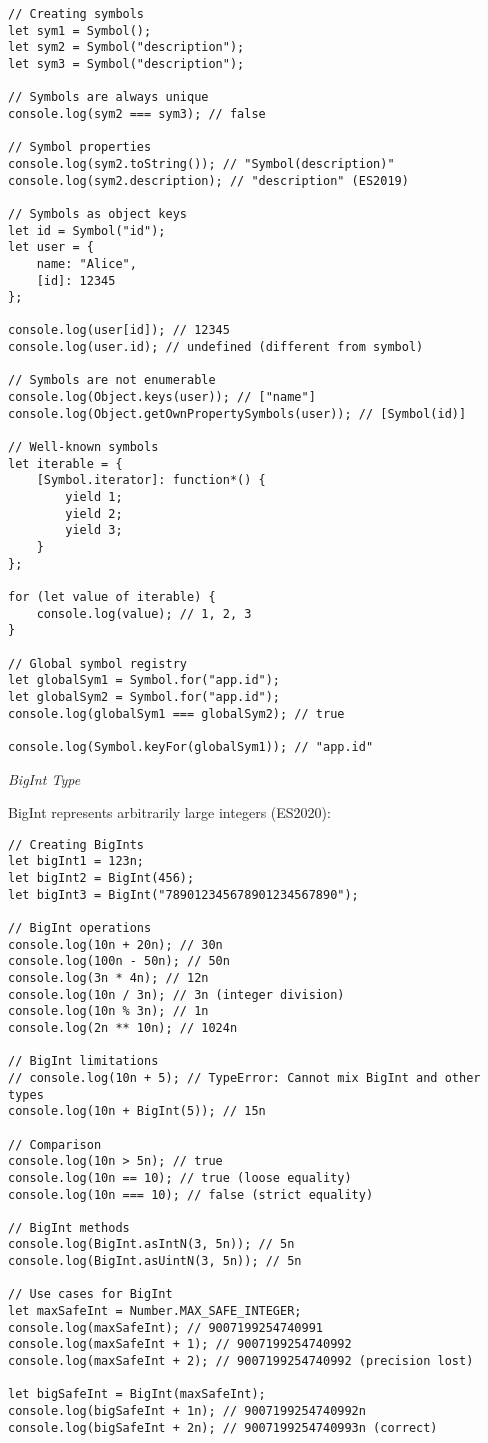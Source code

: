 \documentclass[12pt,a4paper,oneside]{book}
\newcommand{\mysubsubsection}[1]{%
    \vspace{0.1em}
    {\normalsize\itshape #1}
    \vspace{0.1em}
}
\begin{document}
\begin{lstlisting}[style=javascript, caption={\textbf{Symbol Type}}, label=lst:symbol-type]
// Creating symbols
let sym1 = Symbol();
let sym2 = Symbol("description");
let sym3 = Symbol("description");

// Symbols are always unique
console.log(sym2 === sym3); // false

// Symbol properties
console.log(sym2.toString()); // "Symbol(description)"
console.log(sym2.description); // "description" (ES2019)

// Symbols as object keys
let id = Symbol("id");
let user = {
    name: "Alice",
    [id]: 12345
};

console.log(user[id]); // 12345
console.log(user.id); // undefined (different from symbol)

// Symbols are not enumerable
console.log(Object.keys(user)); // ["name"]
console.log(Object.getOwnPropertySymbols(user)); // [Symbol(id)]

// Well-known symbols
let iterable = {
    [Symbol.iterator]: function*() {
        yield 1;
        yield 2;
        yield 3;
    }
};

for (let value of iterable) {
    console.log(value); // 1, 2, 3
}

// Global symbol registry
let globalSym1 = Symbol.for("app.id");
let globalSym2 = Symbol.for("app.id");
console.log(globalSym1 === globalSym2); // true

console.log(Symbol.keyFor(globalSym1)); // "app.id"
\end{lstlisting}

\mysubsubsection{BigInt Type}

BigInt represents arbitrarily large integers (ES2020):

\begin{lstlisting}[style=javascript, caption={\textbf{BigInt Type}}, label=lst:bigint-type]
// Creating BigInts
let bigInt1 = 123n;
let bigInt2 = BigInt(456);
let bigInt3 = BigInt("789012345678901234567890");

// BigInt operations
console.log(10n + 20n); // 30n
console.log(100n - 50n); // 50n
console.log(3n * 4n); // 12n
console.log(10n / 3n); // 3n (integer division)
console.log(10n % 3n); // 1n
console.log(2n ** 10n); // 1024n

// BigInt limitations
// console.log(10n + 5); // TypeError: Cannot mix BigInt and other types
console.log(10n + BigInt(5)); // 15n

// Comparison
console.log(10n > 5n); // true
console.log(10n == 10); // true (loose equality)
console.log(10n === 10); // false (strict equality)

// BigInt methods
console.log(BigInt.asIntN(3, 5n)); // 5n
console.log(BigInt.asUintN(3, 5n)); // 5n

// Use cases for BigInt
let maxSafeInt = Number.MAX_SAFE_INTEGER;
console.log(maxSafeInt); // 9007199254740991
console.log(maxSafeInt + 1); // 9007199254740992
console.log(maxSafeInt + 2); // 9007199254740992 (precision lost)

let bigSafeInt = BigInt(maxSafeInt);
console.log(bigSafeInt + 1n); // 9007199254740992n
console.log(bigSafeInt + 2n); // 9007199254740993n (correct)
\end{lstlisting}
\end{document}
